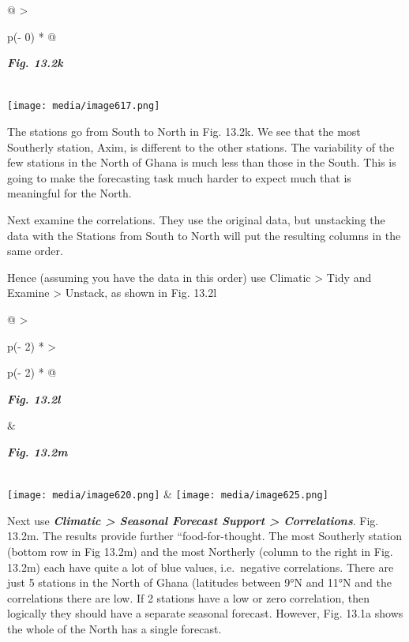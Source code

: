 \documentclass[
  letterpaper,
  DIV=11,
  numbers=noendperiod]{scrreprt}
\begin{document}
\begin{longtable}[]{@{}
  >{\raggedright\arraybackslash}p{(\columnwidth - 0\tabcolsep) * }@{}}
\toprule\noalign{}
\begin{minipage}[b]{\linewidth}\raggedright
\textbf{\emph{Fig. 13.2k}}
\end{minipage} \\
\midrule\noalign{}
\endhead
\bottomrule\noalign{}
\endlastfoot
\texttt{[image: media/image617.png]} \\
\end{longtable}

The stations go from South to North in Fig. 13.2k. We see that the most
Southerly station, Axim, is different to the other stations. The
variability of the few stations in the North of Ghana is much less than
those in the South. This is going to make the forecasting task much
harder to expect much that is meaningful for the North.

Next examine the correlations. They use the original data, but
unstacking the data with the Stations from South to North will put the
resulting columns in the same order.

Hence (assuming you have the data in this order) use Climatic
\textgreater{} Tidy and Examine \textgreater{} Unstack, as shown in Fig.
13.2l

\begin{longtable}[]{@{}
  >{\raggedright\arraybackslash}p{(\columnwidth - 2\tabcolsep) * }
  >{\raggedright\arraybackslash}p{(\columnwidth - 2\tabcolsep) * }@{}}
\toprule\noalign{}
\begin{minipage}[b]{\linewidth}\raggedright
\textbf{\emph{Fig. 13.2l}}
\end{minipage} & \begin{minipage}[b]{\linewidth}\raggedright
\textbf{\emph{Fig. 13.2m}}
\end{minipage} \\
\midrule\noalign{}
\endhead
\bottomrule\noalign{}
\endlastfoot
\texttt{[image: media/image620.png]} &
\texttt{[image: media/image625.png]} \\
\end{longtable}

Next use \textbf{\emph{Climatic \textgreater{} Seasonal Forecast Support
\textgreater{} Correlations}}. Fig. 13.2m. The results provide further
``food-for-thought. The most Southerly station (bottom row in Fig 13.2m)
and the most Northerly (column to the right in Fig. 13.2m) each have
quite a lot of blue values, i.e.~negative correlations. There are just 5
stations in the North of Ghana (latitudes between 9°N and 11°N and the
correlations there are low. If 2 stations have a low or zero
correlation, then logically they should have a separate seasonal
forecast. However, Fig. 13.1a shows the whole of the North has a single
forecast.
\end{document}
